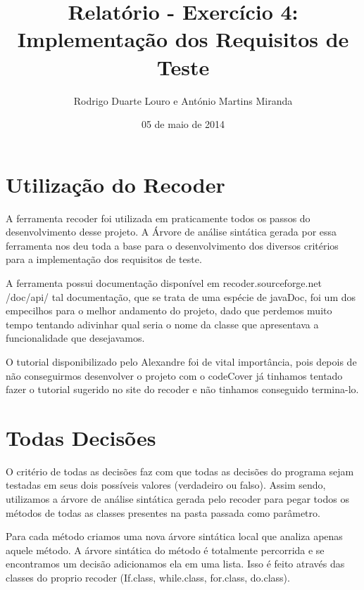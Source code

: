\documentclass[12pt]{article} %
\begin{document}
\title{Relatório - Exercício 4: Implementação dos Requisitos de Teste} %
\author{Rodrigo Duarte Louro e António Martins Miranda} %
\date{05 de maio de 2014} %

\maketitle %

\newpage

\section{Utilização do Recoder}
\mbox{} %

	A ferramenta recoder foi utilizada em praticamente todos os passos do desenvolvimento desse projeto. 
A Árvore de análise sintática gerada por essa ferramenta nos deu toda a base para o desenvolvimento dos 
diversos critérios para a implementação dos requisitos de teste. 

	A ferramenta possui documentação disponível em recoder.sourceforge.net /doc/api/  tal documentação, que se trata de uma espécie de 
javaDoc, foi um dos empecilhos para o melhor andamento do projeto, dado que perdemos muito tempo tentando adivinhar qual seria o nome da classe que apresentava a funcionalidade que desejavamos. 
	
	O tutorial disponibilizado pelo Alexandre foi de vital importância, pois depois de não conseguirmos desenvolver o projeto 
com o codeCover já tinhamos tentado fazer o tutorial sugerido no site do recoder e não tinhamos conseguido termina-lo. 

\section{Todas Decisões}
\mbox{}
	O critério de todas as decisões faz com que todas as decisões do programa sejam testadas em seus dois possíveis valores
(verdadeiro ou falso). Assim sendo, utilizamos a árvore de análise sintática gerada pelo recoder para pegar todos os métodos 
de todas as classes presentes na pasta passada como parâmetro. 
	
	Para cada método criamos uma nova árvore sintática local que analiza apenas aquele método.  A árvore sintática do método
é totalmente percorrida e se encontramos um decisão adicionamos ela em uma lista. Isso é feito através das classes do proprio recoder
(If.class, while.class, for.class, do.class). 
	
\end{document}
